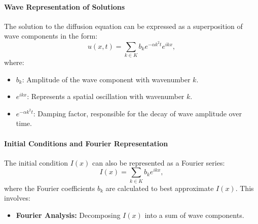 \documentclass{article}
\begin{document}

			
			\paragraph{Wave Representation of Solutions}
			The solution to the diffusion equation can be expressed as a superposition of wave components in the form:
			\[
			u(x, t) = \sum_{k \in K} b_k e^{-\alpha k^2 t} e^{i k x},
			\]
			where:
			\begin{itemize}
				\item \( b_k \): Amplitude of the wave component with wavenumber \( k \).
				\item \( e^{i k x} \): Represents a spatial oscillation with wavenumber \( k \).
				\item \( e^{-\alpha k^2 t} \): Damping factor, responsible for the decay of wave amplitude over time.
			\end{itemize}
			

			
			\paragraph{Initial Conditions and Fourier Representation}
			The initial condition \( I(x) \) can also be represented as a Fourier series:
			\[
			I(x) = \sum_{k \in K} b_k e^{i k x},
			\]
			where the Fourier coefficients \( b_k \) are calculated to best approximate \( I(x) \). This involves:
			\begin{itemize}
				\item \textbf{Fourier Analysis:} Decomposing \( I(x) \) into a sum of wave components.
			\end{itemize}
			
\end{document}
